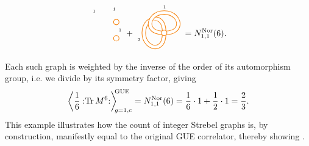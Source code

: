 \documentclass[a4paper,11pt,english]{article}
\theoremstyle{plain}
\theoremstyle{definition}
\theoremstyle{plain}
\newcommand{\cc}{\mathrm{c}}
\DeclareMathOperator{\Tr}{Tr}
\newcommand{\normord}[1]{:\mathrel{#1}:}
\newcommand{\NTr}[1]{\normord{\Tr{#1}}}
\begin{document}
{\begin{align}
\begin{tikzpicture}[x=1pt,y=1pt,scale=.4,baseline={(0, 10cm)}]
        \filldraw[thick,BurntOrange,fill=white](128, 752) circle[radius=8];
        \filldraw[thick,BurntOrange,fill=white](128, 704) circle[radius=8];
        \node at (126, 728) [right] {\tiny$1$};
        \node at (122, 790) {\tiny$1$};
        \node at (76, 784) [left] {\tiny$1$};
    \end{tikzpicture}
    +
    \begin{tikzpicture}[x=1pt,y=1pt,scale=.4,baseline={(0, 10cm)}]
        \draw[BurntOrange,line width=5pt](128, 720) .. controls (128, 768) and (96, 768) .. (80, 752) .. controls (64, 736) and (64, 704) .. (80, 688) .. controls (96, 672) and (128, 672) .. (128, 720);
        \draw[white,line width=3.5pt](128, 720) .. controls (128, 768) and (96, 768) .. (80, 752) .. controls (64, 736) and (64, 704) .. (80, 688) .. controls (96, 672) and (128, 672) .. (128, 720);
        \draw[BurntOrange,line width=5pt](128, 720) .. controls (176, 720) and (176, 752) .. (160, 768) .. controls (144, 784) and (112, 784) .. (96, 768) .. controls (80, 752) and (80, 720) .. (128, 720);
        \draw[white,line width=3.5pt](128, 720) .. controls (176, 720) and (176, 752) .. (160, 768) .. controls (144, 784) and (112, 784) .. (96, 768) .. controls (80, 752) and (80, 720) .. (128, 720);
        \filldraw[thick,BurntOrange,fill=white](128, 720) circle[radius=8];
        \node at (67, 700) [left] {\tiny$2$};
        \node at (129, 784) [above] {\tiny$1$};
    \end{tikzpicture}
    =
    N_{1,1}^{\textup{Nor}}(6).
\end{align}}

Each such graph is weighted by the inverse of the order of its automorphism group, i.e. we divide by its symmetry factor, giving
\begin{equation}
    \left\langle \frac{1}{6} \NTr{M^6} \right\rangle_{\!\!g=1,\cc}^{\!\!\textup{GUE}}
    =
    N_{1,1}^{\textup{Nor}}(6)
    =
    \frac{1}{6} \cdot 1 + \frac{1}{2} \cdot 1 = \frac{2}{3}.
\end{equation}
This example illustrates how the count of integer Strebel graphs is, by construction, manifestly equal to the original GUE correlator, thereby showing .

\end{document}
